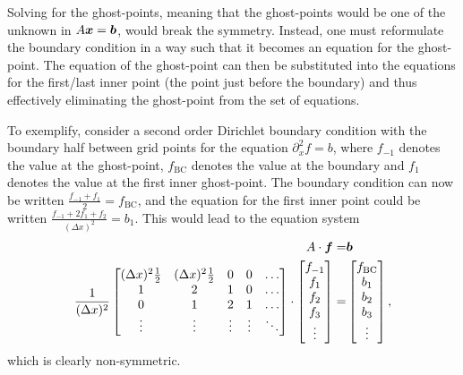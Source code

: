 Solving for the ghost-points, meaning that the ghost-points would be one of the unknown in $A\boldsymbol{x}=\boldsymbol{b}$, would break the symmetry.
Instead, one must reformulate the boundary condition in a way such that it becomes an equation for the ghost-point.
The equation of the ghost-point can then be substituted into the equations for the first/last inner point (the point just before the boundary) and thus effectively eliminating the ghost-point from the set of equations.

To exemplify, consider a second order Dirichlet boundary condition with the boundary half between grid points for the equation $\partial_x^2 f = b$, where $f_{-1}$ denotes the value at the ghost-point, $f_{\text{BC}}$ denotes the value at the boundary and $f_{1}$ denotes the value at the first inner ghost-point.
The boundary condition can now be written $\frac{f_{-1}+f_{1}}{2}=f_{\text{BC}}$, and the equation for the first inner point could be written $\frac{f_{-1}+2f_1+f_{2}}{(\Delta x)^2}=b_1$.
This would lead to the equation system
%
\begin{align*}
    A\cdot\boldsymbol{f}=&\boldsymbol{b}\\
    \frac{1}{(\Delta x)^2}
    \begin{bmatrix}
        (\Delta x)^2\frac{1}{2} & (\Delta x)^2\frac{1}{2} & 0 & 0 & \ldots\\
        1                       & 2                       & 1 & 0 & \ldots\\
        0                       & 1                       & 2 & 1 & \ldots\\
        \vdots                  & \vdots              &\vdots&\vdots&\ddots\\
    \end{bmatrix}
    \cdot
    \begin{bmatrix}
        f_{-1}\\
        f_{1}\\
        f_{2}\\
        f_{3}\\
        \vdots
    \end{bmatrix}
    =&
    \begin{bmatrix}
        f_{\text{BC}}\\
        b_{1}\\
        b_{2}\\
        b_{3}\\
        \vdots
    \end{bmatrix},
\end{align*}
%
which is clearly non-symmetric.

